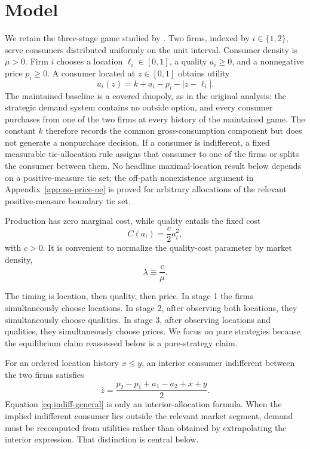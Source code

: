 \section{Model}\label{sec:model}

We retain the three-stage game studied by \citet{Economides1989}. Two firms, indexed by $i\in\{1,2\}$, serve consumers distributed uniformly on the unit interval. Consumer density is $\mu>0$. Firm $i$ chooses a location $\ell_i\in[0,1]$, a quality $a_i\geq 0$, and a nonnegative price $p_i\geq 0$. A consumer located at $z\in[0,1]$ obtains utility
\begin{equation}\label{eq:utility}
 u_i(z)=k+a_i-p_i-|z-\ell_i|.
\end{equation}
The maintained baseline is a covered duopoly, as in the original analysis: the strategic demand system contains no outside option, and every consumer purchases from one of the two firms at every history of the maintained game. The constant $k$ therefore records the common gross-consumption component but does not generate a nonpurchase decision. If a consumer is indifferent, a fixed measurable tie-allocation rule assigns that consumer to one of the firms or splits the consumer between them. No headline maximal-location result below depends on a positive-measure tie set; the off-path nonexistence argument in Appendix~\ref{app:no-price-ne} is proved for arbitrary allocations of the relevant positive-measure boundary tie set.

Production has zero marginal cost, while quality entails the fixed cost
\begin{equation}\label{eq:qualitycost}
 C(a_i)=\frac{c}{2}a_i^2,
\end{equation}
with $c>0$. It is convenient to normalize the quality-cost parameter by market density,
\begin{equation}\label{eq:lambda}
 \lambda\equiv \frac{c}{\mu}.
\end{equation}

The timing is location, then quality, then price. In stage 1 the firms simultaneously choose locations. In stage 2, after observing both locations, they simultaneously choose qualities. In stage 3, after observing locations and qualities, they simultaneously choose prices. We focus on pure strategies because the equilibrium claim reassessed below is a pure-strategy claim.

For an ordered location history $x\leq y$, an interior consumer indifferent between the two firms satisfies
\begin{equation}\label{eq:indiff-general}
 \hat z=\frac{p_2-p_1+a_1-a_2+x+y}{2}.
\end{equation}
Equation \eqref{eq:indiff-general} is only an interior-allocation formula. When the implied indifferent consumer lies outside the relevant market segment, demand must be recomputed from utilities rather than obtained by extrapolating the interior expression. That distinction is central below.

